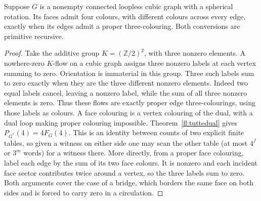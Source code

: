 \begin{corollary}\leavevmode\label{thm:tait}
Suppose $G$ is a nonempty connected loopless cubic graph with a spherical
rotation. Its faces admit four colours, with different colours across every
edge, exactly when its edges admit a proper three-colouring. Both conversions
are primitive recursive.
\end{corollary}
\begin{proof}
Take the additive group $K=(\mathbb Z/2)^2$, with three nonzero elements.
A nowhere-zero $K$-flow on a cubic graph assigns three nonzero labels at each
vertex summing to zero. Orientation is immaterial in this group. Three such
labels sum to zero exactly when they are the three different nonzero elements.
Indeed two equal labels cancel, leaving a nonzero label, while the sum of all
three nonzero elements is zero. Thus these flows are exactly proper
edge three-colourings, using those labels as colours. A face colouring is a
vertex colouring of the dual, with a dual loop making proper colouring
impossible. Theorem~\ref{fl:tuttedual} gives
$P_{G^*}(4)=4F_G(4)$. This is an identity between counts of two explicit
finite tables, so given a witness on either side one may scan the other
table (at most $4^f$ or $3^m$ words) for a witness there. More directly,
from a proper face colouring, label each edge by the sum of its two face
colours. It is nonzero and each incident face sector contributes twice
around a vertex, so the three labels sum to zero. Both arguments cover the
case of a bridge, which borders the same face on both sides and is forced
to carry zero in a circulation.
\end{proof}
